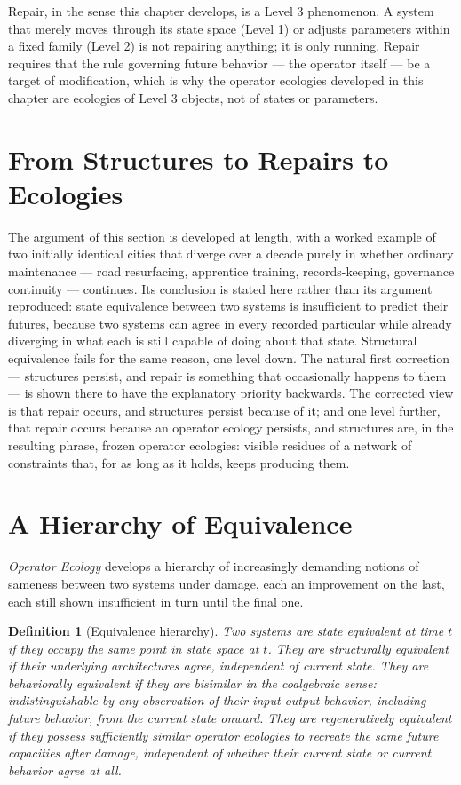 \documentclass[12pt]{report}
\newtheorem{definition}{Definition}[section]
\begin{document}
Repair, in the sense this chapter develops, is a Level 3 phenomenon. A
system that merely moves through its state space (Level 1) or adjusts
parameters within a fixed family (Level 2) is not repairing anything; it
is only running. Repair requires that the rule governing future behavior
--- the operator itself --- be a target of modification, which is why the
operator ecologies developed in this chapter are ecologies of Level 3
objects, not of states or parameters.

\section{From Structures to Repairs to Ecologies}
\label{sec:reframe}

The argument of this section is developed at length, with a worked
example of two initially identical cities that diverge over a decade
purely in whether ordinary maintenance --- road resurfacing, apprentice
training, records-keeping, governance continuity --- continues. Its
conclusion is stated here rather than its argument reproduced: state
equivalence between two systems is insufficient to predict their
futures, because two systems can agree in every recorded particular
while already diverging in
what each is still capable of doing about that state. Structural
equivalence fails for the same reason, one level down. The natural first
correction --- structures persist, and repair is something that
occasionally happens to them --- is shown there to have the explanatory
priority backwards. The corrected view is that repair occurs, and
structures persist because of it; and one level further, that repair
occurs because an operator ecology persists, and structures are, in the
resulting phrase, frozen operator ecologies: visible residues of a
network of constraints that, for as long as it holds, keeps producing
them.

\section{A Hierarchy of Equivalence}
\label{sec:equivalence}

\emph{Operator Ecology} develops a hierarchy of increasingly demanding
notions of sameness between two systems under damage, each an improvement
on the last, each still shown insufficient in turn until the final one.

\begin{definition}[Equivalence hierarchy]
\label{def:equiv-hierarchy}
Two systems are \emph{state equivalent} at time $t$ if they occupy the
same point in state space at $t$. They are \emph{structurally equivalent}
if their underlying architectures agree, independent of current state.
They are \emph{behaviorally equivalent} if they are bisimilar in the
coalgebraic sense: indistinguishable by any observation of their
input-output behavior, including future behavior, from the current state
onward. They are \emph{regeneratively equivalent} if they possess
sufficiently similar operator ecologies to recreate the same future
capacities after damage, independent of whether their current state or
current behavior agree at all.
\end{definition}
\end{document}
